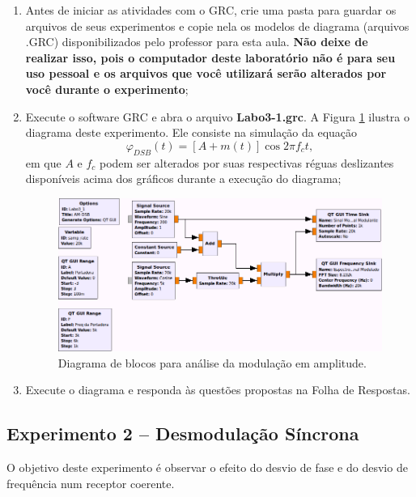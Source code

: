 \documentclass[12pt,addpoints]{exam}
\newcommand{\myscale}{0.4}
\begin{document}
\begin{enumerate}
    \item Antes de iniciar as atividades com o GRC, crie uma pasta para guardar os arquivos de seus experimentos e copie nela os modelos de diagrama (arquivos .GRC) disponibilizados pelo professor para esta aula. \textbf{Não deixe de realizar isso, pois o computador deste laboratório não é para seu uso pessoal e os arquivos que você utilizará serão alterados por você durante o experimento};
    \item Execute o software GRC e abra o arquivo \textbf{Labo3-1.grc}. A Figura \ref{fig:GRC_3-1} ilustra o diagrama deste experimento. Ele consiste na simulação da equação 
\begin{equation} \label{eq:am}
    \varphi_{DSB}(t) = [A + m(t)]\cos{2\pi f_{c}t},
\end{equation}
em que $A$ e $f_c$ podem ser alterados por suas respectivas réguas deslizantes disponíveis acima dos gráficos durante a execução do diagrama;
    \begin{figure}[htb]
        \centering
        \includegraphics[scale=\myscale]{./Figuras/Labo3-1}
        \caption{Diagrama de blocos para análise da modulação em amplitude.} 
        \label{fig:GRC_3-1}
    \end{figure}
  \item Execute o diagrama e responda às questões propostas na Folha de Respostas.
\end{enumerate}

\subsection{Experimento 2 -- Desmodulação Síncrona}

O objetivo deste experimento é observar o efeito do desvio de fase e do desvio de frequência num receptor coerente.
\end{document}
